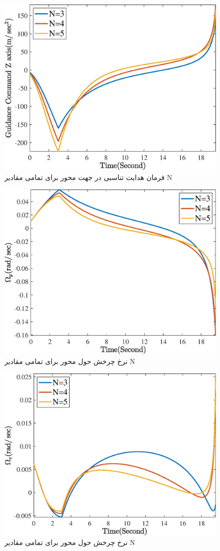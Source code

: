 \begin{figure}[H]
	\centering
	\includegraphics[width=.75\linewidth]{../Figure/Q1/b/GC_z}
	\caption{فرمان هدایت تناسبی در جهت محور
		برای 
		تمامی مقادیر N}
\end{figure}

\begin{figure}[H]
	\centering
	\includegraphics[width=.75\linewidth]{../Figure/Q1/b/Omega_y}
	\caption{ نرخ چرخش حول محور
		برای 
		تمامی مقادیر N}
\end{figure}

\begin{figure}[H]
	\centering
	\includegraphics[width=.75\linewidth]{../Figure/Q1/b/Omega_z}
	\caption{ نرخ چرخش حول محور
		برای 
		تمامی مقادیر N}
\end{figure}



